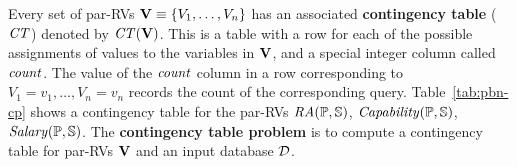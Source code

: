 Every set of par-RVs $\set{V} \equiv \{\V_{1},\ldots,\V_{n} \}$ has an associated \textbf{contingency table} ($\cttable$) denoted by $\cttable(\set{V})$. %
This is a table with a row for each of the possible assignments of values to the variables in $\set{V}$, and a special integer column called $\qcount$. 
The value of the $\qcount$ column in a row 
corresponding to $V_{1} = v_{1},\ldots,V_{n} = v_{n}$ records the count of the 
corresponding query. 
Table~\ref{tab:pbn-cp} shows a contingency table for the par-RVs $\it{RA}(\P,\S)$, $\it{Capability}(\P,\S)$, $\it{Salary}(\P,\S)$. The \textbf{contingency table problem} is to compute a contingency table for par-RVs $\set{V} $ and an input database $\D$. 
 



